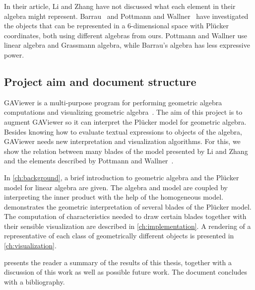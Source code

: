 In their article, Li and Zhang have not discussed what each element in their algebra might represent.  Barrau~\cite{Barrau1,Barrau2} and Pottmann and Wallner~\cite[Chapter 2 and 3]{Pottmann} have investigated the objects that can be represented in a 6-dimensional space with Pl\"ucker coordinates, both using different algebras from ours.  Pottmann and Wallner use linear algebra and Grassmann algebra, while Barrau's algebra has less expressive power.


\subsection{Project aim and document structure}
GAViewer is a multi-purpose program for performing geometric algebra computations and visualizing geometric algebra~\cite{GAViewer}.  The aim of this project is to augment GAViewer so it can interpret the Pl\"ucker model for geometric algebra.  Besides knowing how to evaluate textual expressions to objects of the algebra, GAViewer needs new interpretation and visualization algorithms.  For this, we show the relation between many blades of the model presented by Li and Zhang~\cite{Hongbo} and the elements described by Pottmann and Wallner~\cite{Pottmann}.

In \autoref{ch:background}, a brief introduction to geometric algebra and the Pl\"ucker model for linear algebra are given.  The algebra and model are coupled by interpreting the inner product with the help of the homogeneous model.   demonstrates the geometric interpretation of several blades of the Pl\"ucker model.  The computation of characteristics needed to draw certain blades together with their sensible visualization are described in \autoref{ch:implementation}.  A rendering of a representative of each class of geometrically different objects is presented in \autoref{ch:visualization}.

 presents the reader a summary of the results of this thesis, together with a discussion of this work as well as possible future work.  The document concludes with a bibliography.
